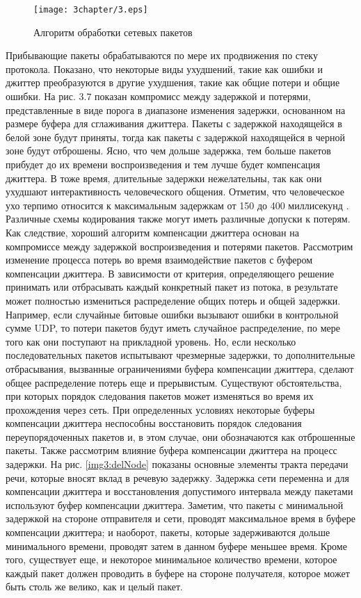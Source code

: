 \begin{figure} [h]
  \center
\texttt{[image: 3chapter/3.eps]}
  \caption{Алгоритм обработки сетевых пакетов}
  \label{img3:algh_pack}
\end{figure}

Прибывающие пакеты обрабатываются по мере их продвижения по стеку протокола. Показано, что некоторые виды ухудшений, такие как ошибки и джиттер преобразуются в другие ухудшения, такие как общие потери и общие ошибки.
На рис. 3.7 показан компромисс между задержкой и потерями, представленные в виде порога в диапазоне изменения задержки, основанном на размере буфера для сглаживания джиттера. Пакеты с задержкой находящейся в белой зоне будут приняты, тогда как пакеты с задержкой находящейся в черной зоне будут отброшены. Ясно, что чем дольше задержка, тем больше пакетов прибудет до их времени воспроизведения и тем лучше будет компенсация джиттера. В тоже время, длительные задержки нежелательны, так как они ухудшают интерактивность человеческого общения. Отметим, что человеческое ухо терпимо относится к максимальным задержкам от 150 до 400 миллисекунд \cite{Moon}. Различные схемы кодирования также могут иметь различные допуски к потерям. Как следствие, хороший алгоритм компенсации джиттера основан на компромиссе между задержкой воспроизведения и потерями пакетов.
Рассмотрим изменение процесса потерь во время взаимодействие пакетов с буфером компенсации джиттера. В зависимости от критерия, определяющего решение принимать или отбрасывать каждый конкретный пакет из потока, в результате может полностью измениться распределение общих потерь и общей задержки. Например, если случайные битовые ошибки вызывают ошибки в контрольной сумме UDP, то потери пакетов будут иметь случайное распределение, по мере того как они поступают на прикладной уровень. Но, если несколько последовательных пакетов испытывают чрезмерные задержки, то дополнительные отбрасывания, вызванные ограничениями буфера компенсации джиттера, сделают общее распределение потерь еще и прерывистым.
Существуют обстоятельства, при которых порядок следования пакетов может изменяться во время их прохождения через сеть. При определенных условиях некоторые буферы компенсации джиттера неспособны восстановить порядок следования переупорядоченных пакетов и, в этом случае, они обозначаются как отброшенные пакеты.
Также рассмотрим влияние буфера компенсации джиттера на процесс задержки. На рис. \ref{img3:delNode} показаны основные элементы тракта передачи речи, которые вносят вклад в речевую задержку. Задержка сети переменна и для компенсации джиттера и восстановления допустимого интервала между пакетами используют буфер компенсации джиттера. Заметим, что пакеты с минимальной задержкой на стороне отправителя и сети, проводят максимальное время в буфере компенсации джиттера; и наоборот, пакеты, которые задерживаются дольше минимального времени, проводят затем в данном буфере меньшее время. Кроме того, существует еще, и некоторое минимальное количество времени, которое каждый пакет должен проводить в буфере на стороне получателя, которое может быть столь же велико, как и целый пакет.

